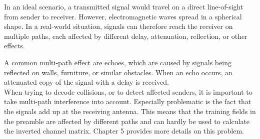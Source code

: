 In an ideal scenario, a transmitted signal would travel on a direct line-of-sight from sender to receiver. However, electromagnetic waves spread in a spherical shape. In a real-world situation, signals can therefore reach the receiver on multiple paths, each affected by different delay, attenuation, reflection, or other effects.

A common multi-path effect are echoes, which are caused by signals being reflected on walls, furniture, or similar obstacles. When an echo occurs, an attenuated copy of the signal with a delay is received.\\

When trying to decode collisions, or to detect affected senders, it is important to take multi-path interference into account. Especially problematic is the fact that the signals add up at the receiving antenna. This means that the training fields in the preamble are affected by different paths and can hardly be used to calculate the inverted channel matrix. Chapter 5 provides more details on this problem.
